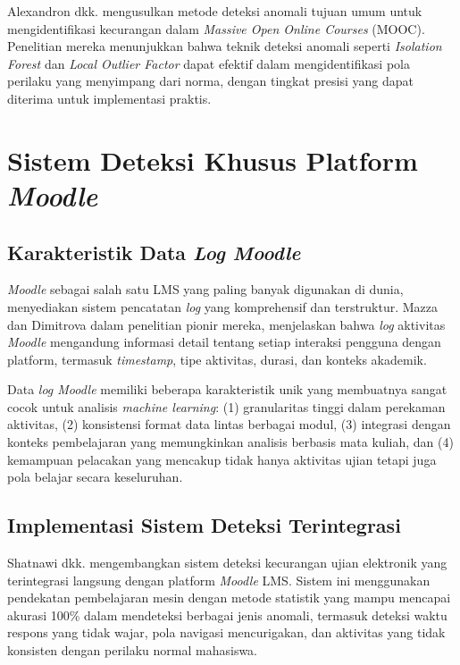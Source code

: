 Alexandron dkk. \cite{Alexandron2019} mengusulkan metode deteksi anomali tujuan umum untuk mengidentifikasi kecurangan dalam \textit{Massive Open Online Courses} (MOOC). Penelitian mereka menunjukkan bahwa teknik deteksi anomali seperti \textit{Isolation Forest} dan \textit{Local Outlier Factor} dapat efektif dalam mengidentifikasi pola perilaku yang menyimpang dari norma, dengan tingkat presisi yang dapat diterima untuk implementasi praktis.

\section{Sistem Deteksi Khusus Platform \textit{Moodle}}
\label{sec:moodleSpecific}

\subsection{Karakteristik Data \textit{Log Moodle}}

\textit{Moodle} sebagai salah satu LMS yang paling banyak digunakan di dunia, menyediakan sistem pencatatan \textit{log} yang komprehensif dan terstruktur. Mazza dan Dimitrova \cite{article:moodle_logs} dalam penelitian pionir mereka, menjelaskan bahwa \textit{log} aktivitas \textit{Moodle} mengandung informasi detail tentang setiap interaksi pengguna dengan platform, termasuk \textit{timestamp}, tipe aktivitas, durasi, dan konteks akademik.

Data \textit{log Moodle} memiliki beberapa karakteristik unik yang membuatnya sangat cocok untuk analisis \textit{machine learning}: (1) granularitas tinggi dalam perekaman aktivitas, (2) konsistensi format data lintas berbagai modul, (3) integrasi dengan konteks pembelajaran yang memungkinkan analisis berbasis mata kuliah, dan (4) kemampuan pelacakan yang mencakup tidak hanya aktivitas ujian tetapi juga pola belajar secara keseluruhan.

\subsection{Implementasi Sistem Deteksi Terintegrasi}

Shatnawi dkk. \cite{Shatnawi2024} mengembangkan sistem deteksi kecurangan ujian elektronik yang terintegrasi langsung dengan platform \textit{Moodle} LMS. Sistem ini menggunakan pendekatan pembelajaran mesin dengan metode statistik yang mampu mencapai akurasi 100\% dalam mendeteksi berbagai jenis anomali, termasuk deteksi waktu respons yang tidak wajar, pola navigasi mencurigakan, dan aktivitas yang tidak konsisten dengan perilaku normal mahasiswa.

